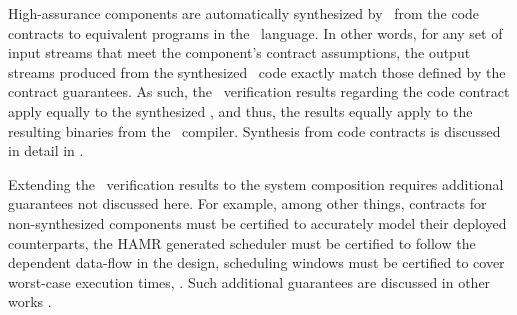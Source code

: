 High-assurance components are automatically synthesized by \splt\ from
the code contracts to equivalent programs in the \ckml\ language.  In
other words, for any set of input streams that meet the component's
contract assumptions, the output streams produced from the synthesized
\ckml\ code exactly match those defined by the contract guarantees.
As such, the \agr\ verification results regarding the code contract
apply equally to the synthesized \ckml, and thus, the results equally
apply to the resulting binaries from the \ckml\ compiler.  Synthesis
from code contracts is discussed in detail in .

Extending the \agr\ verification results to the system composition
requires additional guarantees not discussed here.  For
example, among other things, contracts for non-synthesized components
must be certified to accurately model their deployed counterparts, the
HAMR generated scheduler must be certified to follow the dependent
data-flow in the design, scheduling windows must be certified to cover
worst-case execution times, \etc.  Such additional guarantees are
discussed in other works \cite{gearcase2020, dcrypps2019,
  10.1007/978-3-030-89159-6_18, 10.1007/978-3-030-89159-6_17,
  sel4-2009, scheduled-agree, 9734792}.
